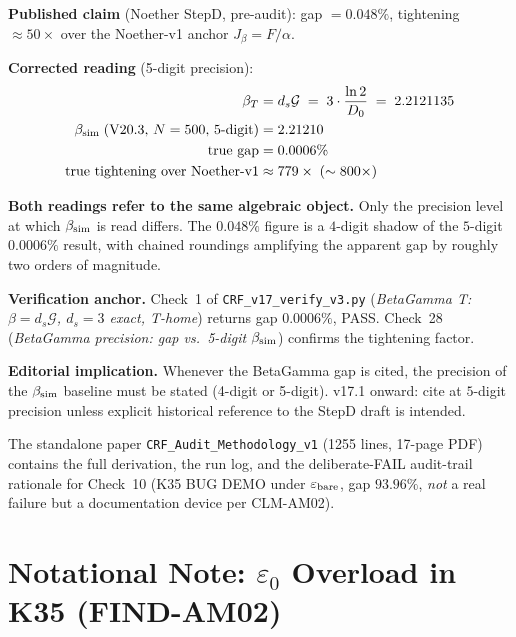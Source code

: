 \documentclass[12pt, a4paper]{article}
\begin{document}
\begin{formalbox}[title={FIND-AM01: $\beta_T$ Precision Truncation}]
\textbf{Published claim} (Noether StepD, pre-audit): gap $= 0.048\%$,
tightening $\approx 50\times$ over the Noether-v1 anchor
$J_\beta = F/\alpha$.

\textbf{Corrected reading} (5-digit precision):
\begin{align*}
\beta_T &= d_s\mathcal{G} \;=\; 3 \cdot \frac{\ln 2}{D_0}
        \;=\; 2.2121135 \\
\beta_{\rm sim}\;(\text{V20.3, }N=500,\,5\text{-digit}) &= 2.21210 \\
\text{true gap} &= 0.0006\% \\
\text{true tightening over Noether-v1} &\approx 779\times \;(\sim 800\times)
\end{align*}

\textbf{Both readings refer to the same algebraic object.} Only the
precision level at which $\beta_{\rm sim}$ is read differs. The
$0.048\%$ figure is a $4$-digit shadow of the $5$-digit $0.0006\%$
result, with chained roundings amplifying the apparent gap by
roughly two orders of magnitude.

\textbf{Verification anchor.} Check~1 of \texttt{CRF\_v17\_verify\_v3.py}
(\textit{BetaGamma T: $\beta = d_s\mathcal{G}$, $d_s = 3$ exact,
T-home}) returns gap $0.0006\%$, PASS. Check~28 (\textit{BetaGamma
precision: gap vs.\ 5-digit $\beta_{\rm sim}$}) confirms the
tightening factor.

\textbf{Editorial implication.} Whenever the BetaGamma gap is cited,
the precision of the $\beta_{\rm sim}$ baseline must be stated (4-digit
or 5-digit). v17.1 onward: cite at $5$-digit precision unless explicit
historical reference to the StepD draft is intended.
\end{formalbox}

The standalone paper \texttt{CRF\_Audit\_Methodology\_v1} (1255 lines,
17-page PDF) contains the full derivation, the run log, and the
deliberate-FAIL audit-trail rationale for Check~10
(K35 BUG DEMO under $\varepsilon_{\rm bare}$, gap $93.96\%$,
\emph{not} a real failure but a documentation device per CLM-AM02).

\section{Notational Note: $\varepsilon_0$ Overload in K35 (FIND-AM02)}
\end{document}
